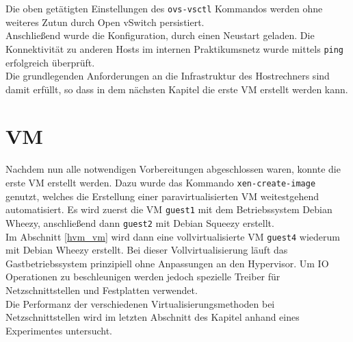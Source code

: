 Die oben getätigten Einstellungen des \verb#ovs-vsctl# Kommandos werden ohne weiteres Zutun durch Open vSwitch persistiert.
\\
Anschließend wurde die Konfiguration, durch einen Neustart geladen. Die Konnektivität zu anderen Hosts im internen Praktikumsnetz wurde mittels \verb#ping# erfolgreich überprüft.
\\
Die grundlegenden Anforderungen an die Infrastruktur des Hostrechners sind damit erfüllt, so dass in dem nächsten Kapitel die erste VM erstellt werden kann.

\chapter{VM}
Nachdem nun alle notwendigen Vorbereitungen abgeschlossen waren, konnte die erste VM erstellt werden. Dazu wurde das Kommando \verb#xen-create-image# genutzt, welches die Erstellung einer paravirtualisierten VM weitestgehend automatisiert. Es wird zuerst die VM \verb#guest1# mit dem Betriebssystem Debian Wheezy, anschließend dann \verb#guest2# mit Debian Squeezy erstellt.
\\
Im Abschnitt \ref{hvm_vm} wird dann eine vollvirtualisierte VM \verb#guest4# wiederum mit Debian Wheezy erstellt. Bei dieser Vollvirtualisierung läuft das Gastbetriebssystem prinzipiell ohne Anpassungen an den Hypervisor. Um IO Operationen zu beschleunigen werden jedoch spezielle Treiber für Netzschnittstellen und Festplatten verwendet. 
\\
Die Performanz der verschiedenen Virtualisierungsmethoden bei Netzschnittstellen wird im letzten Abschnitt des Kapitel anhand eines Experimentes untersucht.



